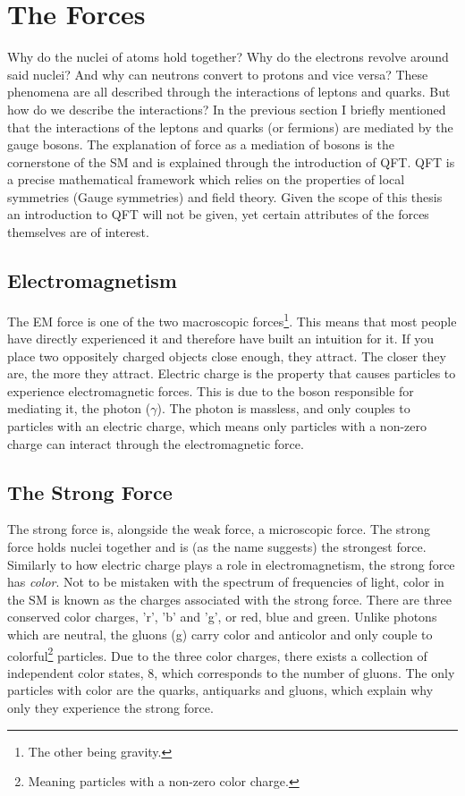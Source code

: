\section{The Forces}
Why do the nuclei of atoms hold together? Why do the electrons revolve
around said nuclei? And why can neutrons convert to protons and vice versa? These phenomena 
are all described through the interactions of leptons and quarks. But how do we describe the 
interactions? In the previous section I briefly mentioned that the interactions of the leptons 
and quarks (or fermions) are mediated by the gauge bosons. The explanation of force as 
a mediation of bosons is the cornerstone of the \ac{SM} and is explained through 
the introduction of \ac{QFT}. \ac{QFT} is a precise mathematical framework which relies on the 
properties of local symmetries (Gauge symmetries) and field theory. Given the scope of this thesis
an introduction to \ac{QFT} will not be given, yet certain attributes of the forces themselves
are of interest. 
\subsection{Electromagnetism}
The \acf{EM} force is one of the two macroscopic forces\footnote{The other being gravity.}.
This means that most people have directly experienced it and therefore have built an intuition for
it. If you place two oppositely charged objects close enough, they attract. The closer they are, 
the more they attract. Electric charge is the property that causes particles to 
experience electromagnetic forces. This is due to the boson responsible for mediating it, 
the photon ($\gamma$). The photon is massless, and only couples to particles with an electric charge,
which means only particles with a non-zero charge can interact through the electromagnetic force.
\subsection{The Strong Force}
The strong force is, alongside the weak force, a microscopic force. The strong force 
holds nuclei together and is (as the name suggests) the strongest force. Similarly to how electric 
charge plays a role in electromagnetism, the strong force has \emph{color}. Not to be mistaken 
with the spectrum of frequencies of light, color in the \ac{SM} is known as the charges 
associated with the strong force. There are three conserved color charges, 'r', 'b' and 'g', or red, blue and green. 
Unlike photons which are neutral, the gluons (g) carry color and anticolor and only couple to 
colorful\footnote{Meaning particles with a non-zero color charge.} particles. 
Due to the three color charges, there exists a collection of independent color states, 8, which 
corresponds to the number of gluons. The only particles with color are the quarks, antiquarks and gluons, which explain why 
only they experience the strong force. 
